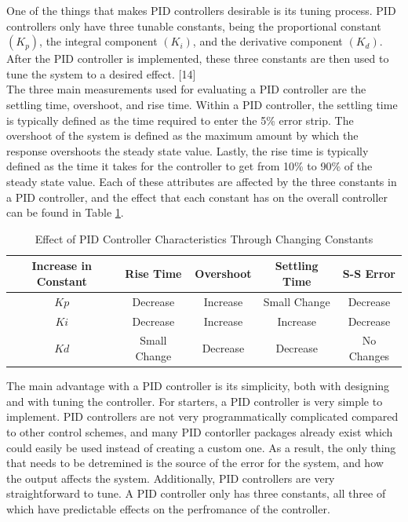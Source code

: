\documentclass[titlepage]{article}
\begin{document}
{\indent One of the things that makes PID controllers desirable is its tuning process. PID controllers only have three tunable constants, being the proportional constant \((K_p)\), the integral component \((K_i)\), and the derivative component \((K_d)\). After the PID controller is implemented, these three constants are then used to tune the system to a desired effect. [14]\\
\indent The three main measurements used for evaluating a PID controller are the settling time, overshoot, and rise time. Within a PID controller, the settling time is typically defined as the time required to enter the 5\% error strip. The overshoot of the system is defined as the maximum amount by which the response overshoots the steady state value. Lastly, the rise time is typically defined as the time it takes for the controller to get from 10\% to 90\% of the steady state value. Each of these attributes are affected by the three constants in a PID controller, and the effect that each constant has on the overall controller can be found in Table \ref{tab:pidvals}.

\begin{table}[H]
	\centering
	\caption{Effect of PID Controller Characteristics Through Changing Constants}
	\begin{tabular}{|c | c | c | c | c |}
		\hline
		Increase in Constant & Rise Time    & Overshoot & Settling Time & S-S Error  \\ [0.5ex]
		\hline
		\(Kp\)               & Decrease     & Increase  & Small Change  & Decrease   \\
		\hline
		\(Ki\)               & Decrease     & Increase  & Increase      & Decrease   \\
		\hline
		\(Kd\)               & Small Change & Decrease  & Decrease      & No Changes \\
		\hline
	\end{tabular}
	\label{tab:pidvals}
\end{table}

The main advantage with a PID controller is its simplicity, both with designing and with tuning the controller. For starters, a PID controller is very simple to implement. PID controllers are not very programmatically complicated compared to other control schemes, and many PID contorller packages already exist which could easily be used instead of creating a custom one. As a result, the only thing that needs to be detremined is the source of the error for the system, and how the output affects the system. Additionally, PID controllers are very straightforward to tune. A PID controller only has three constants, all three of which have predictable effects on the perfromance of the controller.

}
\end{document}
